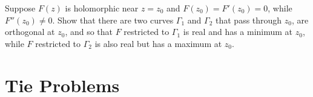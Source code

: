 \documentclass[12pt]{article}
\begin{document}
\begin{statement}[8.5.2]
  Suppose $F(z)$ is holomorphic near $z=z_0$ and $F(z_0)=F'(z_0)=0$, while $F''(z_0) \neq 0$. Show that 
  there are two curves $\Gamma_1$ and $\Gamma_2$ that pass through $z_0$, are orthogonal at 
  $z_0$, and so that $F$ restricted to $\Gamma_1$ is real and has a minimum at $z_0$, while $F$ 
  restricted to $\Gamma_2$ is also real but has a maximum at $z_0$. 
\end{statement}
\begin{newproof}
  
\end{newproof}

\section{Tie Problems}
\end{document}
